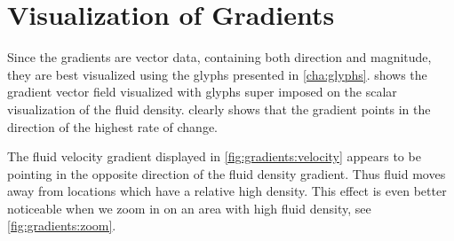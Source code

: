 \section{Visualization of Gradients} %
\label{sec:visualization_of_gradients}
Since the gradients are vector data, containing both direction and magnitude, they are best visualized using the glyphs presented in \cref{cha:glyphs}.  shows the gradient vector field visualized with glyphs super imposed on the scalar visualization of the fluid density.  clearly shows that the gradient points in the direction of the highest rate of change.

The fluid velocity gradient displayed in \cref{fig:gradients:velocity} appears to be pointing in the opposite direction of the fluid density gradient. Thus fluid moves away from locations which have a relative high density. This effect is even better noticeable when we zoom in on an area with high fluid density, see \cref{fig:gradients:zoom}.
